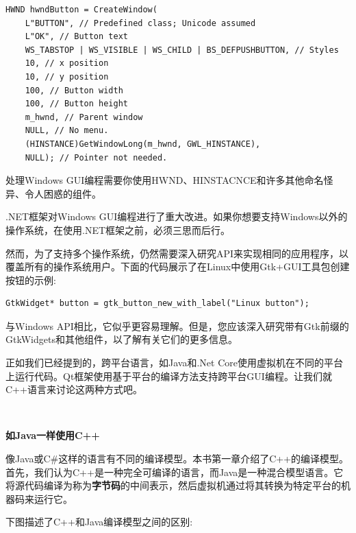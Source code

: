 \begin{lstlisting}[caption={}]
HWND hwndButton = CreateWindow(
	L"BUTTON", // Predefined class; Unicode assumed
	L"OK", // Button text
	WS_TABSTOP | WS_VISIBLE | WS_CHILD | BS_DEFPUSHBUTTON, // Styles
	10, // x position
	10, // y position
	100, // Button width
	100, // Button height
	m_hwnd, // Parent window
	NULL, // No menu.
	(HINSTANCE)GetWindowLong(m_hwnd, GWL_HINSTANCE),
	NULL); // Pointer not needed.
\end{lstlisting}

处理Windows GUI编程需要你使用HWND、HINSTACNCE和许多其他命名怪异、令人困惑的组件。 \par
.NET框架对Windows GUI编程进行了重大改进。如果你想要支持Windows以外的操作系统，在使用.NET框架之前，必须三思而后行。 \par
然而，为了支持多个操作系统，仍然需要深入研究API来实现相同的应用程序，以覆盖所有的操作系统用户。下面的代码展示了在Linux中使用Gtk+GUI工具包创建按钮的示例: \par

\begin{lstlisting}[caption={}]
GtkWidget* button = gtk_button_new_with_label("Linux button");
\end{lstlisting}

与Windows API相比，它似乎更容易理解。但是，您应该深入研究带有Gtk前缀的GtkWidgets和其他组件，以了解有关它们的更多信息。 \par
正如我们已经提到的，跨平台语言，如Java和.Net Core使用虚拟机在不同的平台上运行代码。Qt框架使用基于平台的编译方法支持跨平台GUI编程。让我们就C++语言来讨论这两种方式吧。 \par

\noindent\textbf{}\ \par
\textbf{如Java一样使用C++} \ \par
像Java或C\#这样的语言有不同的编译模型。本书第一章介绍了C++的编译模型。首先，我们认为C++是一种完全可编译的语言，而Java是一种混合模型语言。它将源代码编译为称为\textbf{字节码}的中间表示，然后虚拟机通过将其转换为特定平台的机器码来运行它。 \par
下图描述了C++和Java编译模型之间的区别: \par

